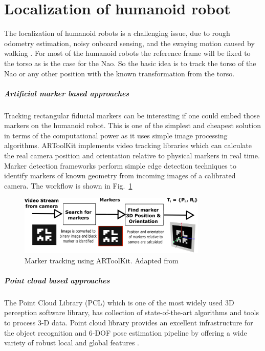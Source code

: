 \section{Localization of humanoid robot} %
The localization of humanoid robots is a challenging issue, due to rough odometry estimation, noisy onboard sensing, and the swaying motion caused by walking \cite{cervera2012localization}. For most of the humanoid robots the reference frame will be fixed to the torso as is the case for the Nao. So the basic idea is to track the torso of the Nao or any other position with the known transformation from the torso.
\subparagraph{Artificial marker based approaches}
Tracking rectangular fiducial markers can be interesting if one could embed those markers on the humanoid robot. This is one of the simplest and cheapest solution in terms of the computational power as it uses simple image processing algorithms. ARToolKit \cite{kato1999marker} implements video tracking libraries which can calculate the real camera position and orientation relative to physical markers in real time. Marker detection frameworks perform simple edge detection techniques to identify markers of known geometry from incoming images of a calibrated camera. The workflow is shown in Fig.~\ref{fig:artoolkit}
\begin{figure}[H]
\centering
\includegraphics[width=0.8\textwidth]{assets/artoolkit.eps}
\caption[Marker tracking using ARToolKit]{Marker tracking using ARToolKit. {Adapted from \cite{kato1999marker}}}
\label{fig:artoolkit}
\end{figure}
\subparagraph{Point cloud based approaches}
\label{ssec:pcl}
The Point Cloud Library (PCL) \cite{rusu20113d} which is one of the most widely used 3D perception software library, has collection of state-of-the-art algorithms and tools to process 3-D data. Point cloud library provides an excellent infrastructure for the object recognition and 6-DOF pose estimation pipeline by offering a wide variety of robust local and global features \cite{aldoma2012point}. 

